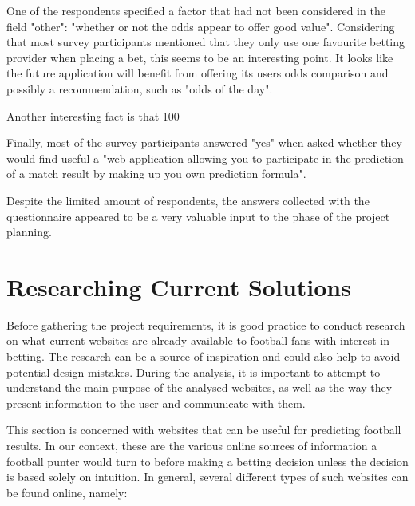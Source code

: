 One of the respondents specified a factor that had not been considered in the field "other": "whether or not the odds appear to offer good value". Considering that most survey participants mentioned that they only use one favourite betting provider when placing a bet, this seems to be an interesting point. It looks like the future application will benefit from offering its users odds comparison and possibly a recommendation, such as "odds of the day".

Another interesting fact is that 100%

Finally, most of the survey participants answered "yes" when asked whether they would find useful a "web application allowing you to participate in the prediction of a match result by making up you own prediction formula". 

Despite the limited amount of respondents, the answers collected with the questionnaire appeared to be a very valuable input to the phase of the project planning.

\section{Researching Current Solutions}
\label{sec:currentsolutions_req}
Before gathering the project requirements, it is good practice to conduct research on what current websites are already available to football fans with interest in betting. The research can be a source of inspiration and could also help to avoid potential design mistakes. During the analysis, it is important to attempt to understand the main purpose of the analysed websites, as well as the way they present information to the user and communicate with them.

This section is concerned with websites that can be useful for predicting football results. In our context, these are the various online sources of information a football punter would turn to before making a betting decision unless the decision is based solely on intuition. In general, several different types of such websites can be found online, namely:
		
